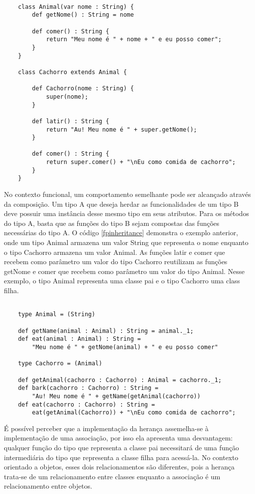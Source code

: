 \begin{lstlisting}[caption={Herança em Orientação a Objetos},label=ooinheritance]
    
    class Animal(var nome : String) {
        def getNome() : String = nome
        
        def comer() : String {
            return "Meu nome é " + nome + " e eu posso comer";
        }
    }

    class Cachorro extends Animal {
        
        def Cachorro(nome : String) {
            super(nome);
        }

        def latir() : String {
            return "Au! Meu nome é " + super.getNome();
        }

        def comer() : String {
            return super.comer() + "\nEu como comida de cachorro";
        }
    }

\end{lstlisting}

No contexto funcional, um comportamento semelhante 
pode ser alcançado através da composição. Um tipo A 
que deseja herdar as funcionalidades de um tipo B 
deve possuir uma instância desse mesmo tipo em seus 
atributos. Para os métodos do tipo A, basta que as 
funções do tipo B sejam compostas das funções 
necessárias do tipo A. O código \ref{fpinheritance} 
demonstra o exemplo anterior, onde um tipo Animal 
armazena um valor String que representa o nome 
enquanto o tipo Cachorro armazena um valor Animal. 
As funções latir e comer que recebem como parâmetro 
um valor do tipo Cachorro reutilizam as funções getNome 
e comer que recebem como parâmetro um valor do tipo 
Animal. Nesse exemplo, o tipo Animal representa 
uma classe pai e o tipo Cachorro uma class filha.

\begin{lstlisting}[caption={Herança em Programação Funcional},label=fpinheritance]
    
    type Animal = (String)

    def getName(animal : Animal) : String = animal._1;
    def eat(animal : Animal) : String = 
        "Meu nome é " + getNome(animal) + " e eu posso comer"

    type Cachorro = (Animal)

    def getAnimal(cachorro : Cachorro) : Animal = cachorro._1;
    def bark(cachorro : Cachorro) : String = 
        "Au! Meu nome é " + getName(getAnimal(cachorro))
    def eat(cachorro : Cachorro) : String = 
        eat(getAnimal(Cachorro)) + "\nEu como comida de cachorro";

\end{lstlisting}

É possível perceber que a implementação da herança 
assemelha-se à implementação de uma associação, 
por isso ela apresenta uma desvantagem: 
qualquer função do tipo que representa 
a classe pai necessitará de uma função 
intermediária do tipo que representa a classe 
filha para acessá-la. 
No contexto orientado a objetos, esses dois 
relacionamentos são diferentes, pois a 
herança trata-se de um relacionamento entre 
classes enquanto a associação é um relacionamento 
entre objetos\cite{umlsystems}. 